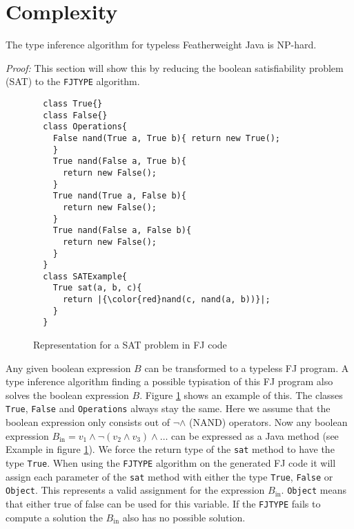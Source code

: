 \section{Complexity}
\label{sec:complexity}

\begin{theorem}[NP-Hardness]
  \label{theo:np-hardness}
  The type inference algorithm for typeless Featherweight Java is NP-hard.
\end{theorem}

\textit{Proof:} This section will show this by reducing the boolean satisfiability problem (SAT) to the \texttt{FJTYPE} algorithm.

\begin{figure}
\begin{lstlisting}
  class True{}
  class False{}
  class Operations{
    False nand(True a, True b){ return new True();
    }
    True nand(False a, True b){
      return new False();
    }
    True nand(True a, False b){
      return new False();
    }
    True nand(False a, False b){
      return new False();
    }
  }
  class SATExample{
    True sat(a, b, c){
      return |{\color{red}nand(c, nand(a, b))}|;
    }
  }
\end{lstlisting}

\caption{Representation for a SAT problem in FJ code}
\label{fig:fjSATcode}
\end{figure}

Any given boolean expression $B$ can be transformed to a typeless FJ program.
A type inference algorithm finding a possible typisation of this FJ program also solves the boolean expression $B$.
Figure \ref{fig:fjSATcode} shows an example of this.
The classes \texttt{True}, \texttt{False} and \texttt{Operations} always stay the same.
Here we assume that the boolean expression only consists out of $\neg \land$ (NAND) operators.
Now any boolean expression $B_\text{in} = v_1 \land \neg (v_2 \land v_3) \land \ldots$ can be expressed as a Java method
(see  Example in figure \ref{fig:fjSATcode}).
We force the return type of the \texttt{sat} method to have the type \texttt{True}.
When using the \texttt{FJTYPE} algorithm on the generated FJ code it will
assign each parameter of the \texttt{sat} method with either the type \texttt{True}, \texttt{False}
or \texttt{Object}.
This represents a valid assignment for the expression $B_\text{in}$.
\texttt{Object} means that either true of false can be used for this variable.
If the \texttt{FJTYPE} fails to compute a solution the $B_\text{in}$ also has no possible solution.

